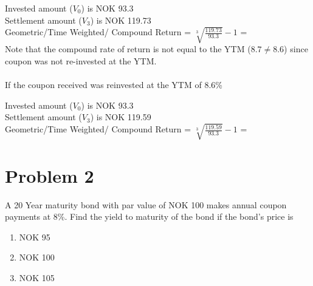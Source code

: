 \documentclass[12]{article}
\begin{document}
\noindent
Invested amount ($V_0$) is NOK 93.3\\
Settlement amount ($V_3$) is NOK 119.73\\
Geometric/Time Weighted/ Compound Return =  {\Large $\sqrt[3]{\frac{119.73}{93.3}} - 1$} = \\
Note that the compound rate of return is not equal to the YTM ($8.7 \neq 8.6$) since coupon was not re-invested at the YTM.\\
\\
If the coupon received was reinvested at the YTM of 8.6\%
\begin{table}[H]
    \centering
    \label{tab:my_label}
\end{table}

\noindent
Invested amount ($V_0$) is NOK 93.3\\
Settlement amount ($V_3$) is NOK 119.59\\
Geometric/Time Weighted/ Compound Return =  {\Large $\sqrt[3]{\frac{119.59}{93.3}} - 1$} = \\







\color{black}
\section*{Problem 2}
A 20 Year maturity bond with par value of NOK 100 makes annual coupon payments at 8\%. Find the yield to maturity of the bond if the bond's price is
\begin{enumerate}
    \item[a)] NOK 95
    \item[b)] NOK 100
    \item[c)] NOK 105
\end{enumerate}
\end{document}
